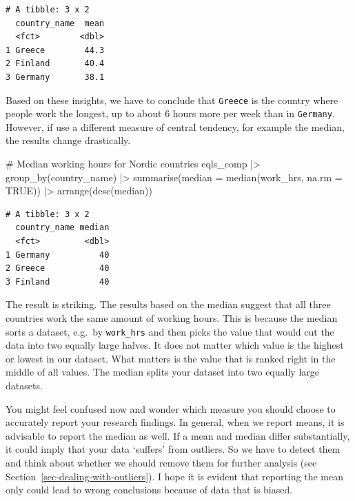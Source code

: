 \documentclass[
  letterpaper,
  DIV=11,
  numbers=noendperiod]{scrreprt}
\newenvironment{Shaded}{\begin{snugshade}}{\end{snugshade}}
\newcommand{\AttributeTok}[1]{\textcolor[rgb]{0.40,0.45,0.13}{#1}}
\newcommand{\CommentTok}[1]{\textcolor[rgb]{0.37,0.37,0.37}{#1}}
\newcommand{\ConstantTok}[1]{\textcolor[rgb]{0.56,0.35,0.01}{#1}}
\newcommand{\FunctionTok}[1]{\textcolor[rgb]{0.28,0.35,0.67}{#1}}
\newcommand{\NormalTok}[1]{\textcolor[rgb]{0.00,0.23,0.31}{#1}}
\newcommand{\SpecialCharTok}[1]{\textcolor[rgb]{0.37,0.37,0.37}{#1}}
\begin{document}
\begin{verbatim}
# A tibble: 3 x 2
  country_name  mean
  <fct>        <dbl>
1 Greece        44.3
2 Finland       40.4
3 Germany       38.1
\end{verbatim}

Based on these insights, we have to conclude that \texttt{Greece} is the
country where people work the longest, up to about 6 hours more per week
than in \texttt{Germany}. However, if use a different measure of central
tendency, for example the median, the results change drastically.

\begin{Shaded}
\begin{Highlighting}[]
\CommentTok{\# Median working hours for Nordic countries}
\NormalTok{eqls\_comp }\SpecialCharTok{|\textgreater{}}
  \FunctionTok{group\_by}\NormalTok{(country\_name) }\SpecialCharTok{|\textgreater{}}
  \FunctionTok{summarise}\NormalTok{(}\AttributeTok{median =} \FunctionTok{median}\NormalTok{(work\_hrs, }\AttributeTok{na.rm =} \ConstantTok{TRUE}\NormalTok{)) }\SpecialCharTok{|\textgreater{}}
  \FunctionTok{arrange}\NormalTok{(}\FunctionTok{desc}\NormalTok{(median))}
\end{Highlighting}
\end{Shaded}

\begin{verbatim}
# A tibble: 3 x 2
  country_name median
  <fct>         <dbl>
1 Germany          40
2 Greece           40
3 Finland          40
\end{verbatim}

The result is striking. The results based on the median suggest that all
three countries work the same amount of working hours. This is because
the median sorts a dataset, e.g.~by \texttt{work\_hrs} and then picks
the value that would cut the data into two equally large halves. It does
not matter which value is the highest or lowest in our dataset. What
matters is the value that is ranked right in the middle of all values.
The median splits your dataset into two equally large datasets.

You might feel confused now and wonder which measure you should choose
to accurately report your research findings. In general, when we report
means, it is advisable to report the median as well. If a mean and
median differ substantially, it could imply that your data `suffers'
from outliers. So we have to detect them and think about whether we
should remove them for further analysis (see
Section~\ref{sec-dealing-with-outliers}). I hope it is evident that
reporting the mean only could lead to wrong conclusions because of data
that is biased.
\end{document}
